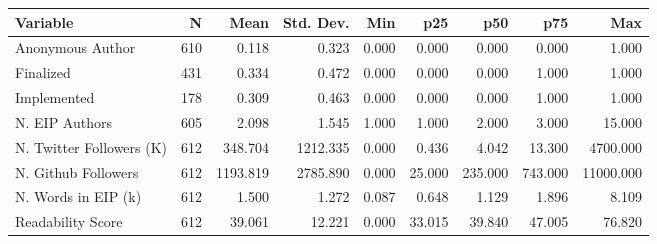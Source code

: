 \begin{tabular}{lrrrrrrrr}
\toprule
Variable & N & Mean & Std. Dev. & Min & p25 & p50 & p75 & Max \\
\midrule
Anonymous Author & 610 & 0.118 & 0.323 & 0.000 & 0.000 & 0.000 & 0.000 & 1.000 \\
Finalized & 431 & 0.334 & 0.472 & 0.000 & 0.000 & 0.000 & 1.000 & 1.000 \\
Implemented & 178 & 0.309 & 0.463 & 0.000 & 0.000 & 0.000 & 1.000 & 1.000 \\
N. EIP Authors & 605 & 2.098 & 1.545 & 1.000 & 1.000 & 2.000 & 3.000 & 15.000 \\
N. Twitter Followers (K) & 612 & 348.704 & 1212.335 & 0.000 & 0.436 & 4.042 & 13.300 & 4700.000 \\
N. Github Followers & 612 & 1193.819 & 2785.890 & 0.000 & 25.000 & 235.000 & 743.000 & 11000.000 \\
N. Words in EIP (k) & 612 & 1.500 & 1.272 & 0.087 & 0.648 & 1.129 & 1.896 & 8.109 \\
Readability Score & 612 & 39.061 & 12.221 & 0.000 & 33.015 & 39.840 & 47.005 & 76.820 \\
\bottomrule
\end{tabular}
